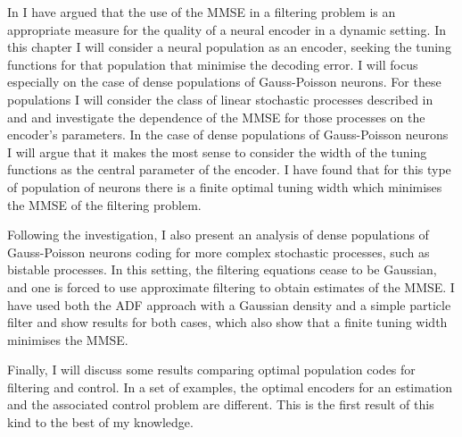 
In  I have argued that the use of the MMSE in a filtering problem is an appropriate measure for the quality of a neural encoder in a dynamic setting. In 
this chapter I will consider a neural population as an encoder, seeking the tuning functions for that population that minimise the decoding error.
I will focus especially on the case of dense populations of Gauss-Poisson neurons. For these populations I will consider the class of
linear stochastic processes described in  and  and investigate the dependence of the MMSE for those processes on the encoder's 
parameters. In the case of dense populations of Gauss-Poisson neurons I will argue that it makes the most sense to consider the width of the tuning functions as the central parameter 
of the encoder. I have found that for this type of population of neurons there is a finite optimal tuning width which minimises the
MMSE of the filtering problem.\par

Following the investigation, I also present an analysis of dense populations of Gauss-Poisson neurons coding for more complex stochastic processes, such as bistable
processes. In this setting, the filtering equations cease to be Gaussian, and one is forced to use approximate filtering to obtain estimates of the MMSE.
I have used both the ADF approach with a Gaussian density and a simple particle filter and show results for both cases, which also show that a finite tuning width minimises
the MMSE.\par

Finally, I will discuss some results comparing optimal population codes for filtering and control. In a set of examples, the
optimal encoders for an estimation and the associated control problem are different. This is the first result of this kind to the best of my knowledge.\par

